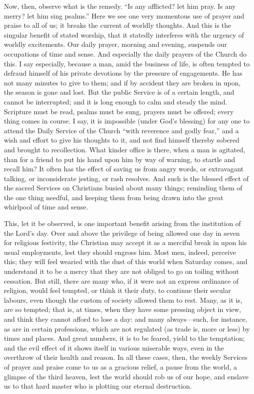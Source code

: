 Now, then, observe what is the remedy. ``Is any afflicted? let
him pray. Is any merry? let him sing psalms.'' Here we see one
very momentous use of prayer and praise to all of us; it breaks the
current of worldly thoughts. And this is the singular benefit of
stated worship, that it statedly interferes with the urgency of
worldly excitements. Our daily prayer, morning and evening, suspends
our occupations of time and sense. And especially the daily prayers of
the Church do this. I say especially, because a man, amid the business
of life, is often tempted to defraud himself of his private devotions
by the pressure of engagements. He has not many minutes to give to
them; and if by accident they are broken in upon, the season is gone
and lost. But the public Service is of a certain length, and cannot be
interrupted; and it is long enough to calm and steady the mind.
Scripture must be read, psalms must be sung, prayers must be offered;
every thing comes in course. I say, it is impossible (under God's
blessing) for any one to attend the Daily Service of the Church
``with reverence and godly fear,'' and a wish and effort to
give his thoughts to it, and not find himself thereby sobered and
brought to recollection. What kinder office is there, when a man is
agitated, than for a friend to put his hand upon him by way of
warning, to startle and recall him? It often has the effect of saving
us from angry words, or extravagant talking, or inconsiderate jesting,
or rash resolves. And such is the blessed effect of the sacred
Services on Christians busied about many things; reminding them of the
one thing needful, and keeping them from being drawn into the great
whirlpool of time and sense.

This, let it be observed, is one important benefit arising from the
institution of the Lord's day. Over and above the privilege of being
allowed one day in seven for religious festivity, the Christian may
accept it as a merciful break in upon his usual employments, lest they
should engross him. Most men, indeed, perceive this; they will feel
wearied with the dust of this world when Saturday comes, and
understand it to be a mercy that they are not obliged to go on toiling
without cessation. But still, there are many who, if it were not an
express ordinance of religion, would feel tempted, or think it their
duty, to continue their secular labours, even though the custom of
society allowed them to rest. Many, as it is, are so tempted; that is,
at times, when they have some pressing object in view, and think they
cannot afford to lose a day: and many always—such, for instance, as
are in certain professions, which are not regulated (as trade is, more
or less) by times and places. And great numbers, it is to be feared,
yield to the temptation; and the evil effect of it shows itself in
various miserable ways, even in the overthrow of their health and
reason. In all these cases, then, the weekly Services of prayer and
praise come to us as a gracious relief, a pause from the world, a
glimpse of the third heaven, lest the world should rob us of our hope,
and enslave us to that hard master who is plotting our eternal
destruction.

